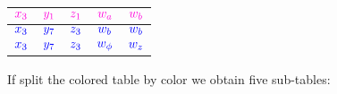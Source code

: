 \documentclass{article}
\begin{document}
{\begin{flushright}
\begin{tabular}{lllll}
    \multicolumn{1}{|c|}{$\textcolor{mywhat}{x_3}$} & \multicolumn{1}{c|}{$\textcolor{mywhat}{y_1}$} & \multicolumn{1}{c|}{$\textcolor{mywhat}{z_1}$} & \multicolumn{1}{c|}{$\textcolor{mywhat}{w_a}$} & \multicolumn{1}{c|}{$\textcolor{mywhat}{w_b}$}\\ \hline
    \multicolumn{1}{|c|}{$\textcolor{myblue}{x_3}$} & \multicolumn{1}{c|}{$\textcolor{myblue}{y_7}$} & \multicolumn{1}{c|}{$\textcolor{myblue}{z_3}$} & \multicolumn{1}{c|}{$\textcolor{myblue}{w_b}$} & \multicolumn{1}{c|}{$\textcolor{myblue}{w_b}$}\\ \hline
    \multicolumn{1}{|c|}{$\textcolor{myblue}{x_3}$} & \multicolumn{1}{c|}{$\textcolor{myblue}{y_7}$} & \multicolumn{1}{c|}{$\textcolor{myblue}{z_3}$} & \multicolumn{1}{c|}{$\textcolor{myblue}{w_\phi}$} & \multicolumn{1}{c|}{$\textcolor{myblue}{w_z}$}\\ \hline

\end{tabular}
\end{flushright}
}

If split the colored table by color we obtain five sub-tables:

\vskip 0.2in
\end{document}
